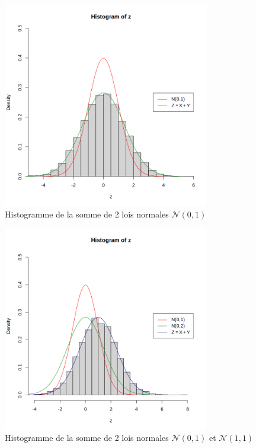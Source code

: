       \begin{table}[H]
        \centering
        \begin{minipage}{0.28\textwidth}
            \centering
            \begin{figure}[H]
                \centering
                \includegraphics[width=0.80\textwidth]{4_attachments/figures/output31.png}
                \caption{Histogramme de la somme de 2 lois normales $\mathcal N(0,1)$}
                \label{fig:fig1}
            \end{figure}
         \end{minipage}
        \hfill
        \begin{minipage}{0.28\textwidth}
            \centering
            \begin{figure}[H]
                \centering
                \includegraphics[width=0.80\textwidth]{4_attachments/figures/output32.png}
                \caption{Histogramme de la somme de 2 lois normales $\mathcal N(0,1)$ et $\mathcal N(1,1)$}
                \label{fig:fig2}
            \end{figure}
            

\end{minipage}
\end{table}
